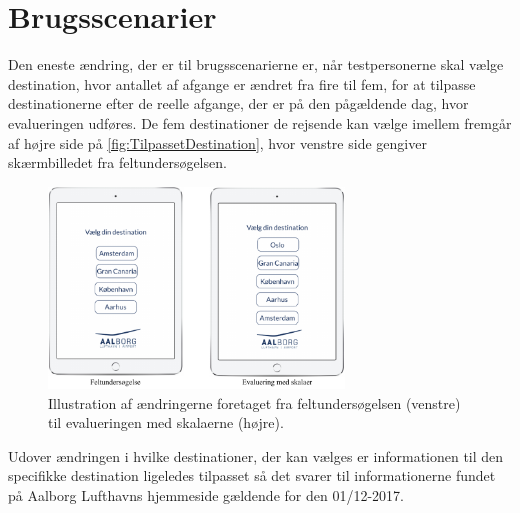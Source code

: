 \section{Brugsscenarier}
\label{TestAfSkalaBrugsscenarier}
%
Den eneste ændring, der er til brugsscenarierne er, når testpersonerne skal vælge destination, hvor antallet af afgange er ændret fra fire til fem, for at tilpasse destinationerne efter de reelle afgange, der er på den pågældende dag, hvor evalueringen udføres. De fem destinationer de rejsende kan vælge imellem fremgår af højre side på \autoref{fig:TilpassetDestination}, hvor venstre side gengiver skærmbilledet fra feltundersøgelsen. 
%
\begin{figure}[H]
\centering
\includegraphics[width =0.7\textwidth]{Figure/TestdesignEvaluering/TilpassetDestination} 
\caption{Illustration af ændringerne foretaget fra feltundersøgelsen (venstre) til evalueringen med skalaerne (højre).}
\label{fig:TilpassetDestination}
\end{figure}
\noindent
%
Udover ændringen i hvilke destinationer, der kan vælges er informationen til den specifikke destination ligeledes tilpasset så det svarer til informationerne fundet på Aalborg Lufthavns hjemmeside gældende for den 01/12-2017. 